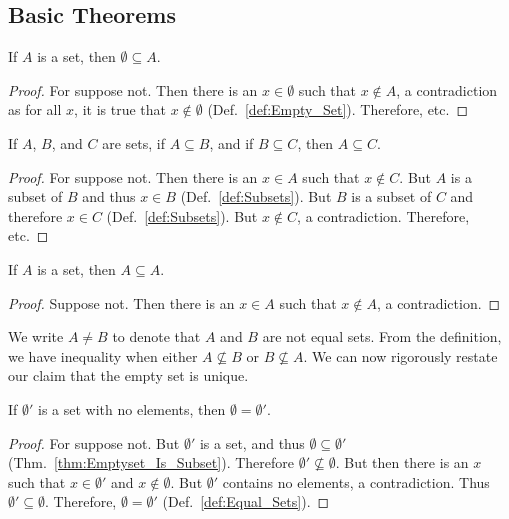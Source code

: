     \subsection{Basic Theorems}
        \begin{theorem}
            \label{thm:Emptyset_Is_Subset}%
            If $A$ is a set, then $\emptyset\subseteq{A}$.
        \end{theorem}
        \begin{proof}
            For suppose not. Then there is an $x\in\emptyset$
            such that $x\notin{A}$, a contradiction as
            for all $x$, it is true that $x\notin\emptyset$
            (Def.~\ref{def:Empty_Set}). Therefore, etc.
        \end{proof}
        \begin{theorem}
            \label{thm:Subset_is_Transitive}%
            If $A$, $B$, and $C$ are sets, if
            $A\subseteq{B}$, and if $B\subseteq{C}$, then
            $A\subseteq{C}$.
        \end{theorem}
        \begin{proof}
            For suppose not. Then there is an $x\in{A}$ such
            that $x\notin{C}$. But $A$ is a subset of $B$
            and thus $x\in{B}$ (Def.~\ref{def:Subsets}). But
            $B$ is a subset of $C$ and therefore $x\in{C}$
            (Def.~\ref{def:Subsets}). But $x\notin{C}$, a
            contradiction. Therefore, etc.
        \end{proof}
        \begin{theorem}
            \label{thm:Set_Is_Subset_Of_Self}%
            If $A$ is a set, then $A\subseteq{A}$.
        \end{theorem}
        \begin{proof}
            Suppose not. Then there is an $x\in{A}$
            such that $x\notin{A}$, a contradiction.
        \end{proof}
        We write $A\ne{B}$ to denote that $A$ and $B$ are
        not equal sets. From the definition, we have
        inequality when either $A\nsubseteq{B}$ or
        $B\nsubseteq{A}$.
        We can now rigorously restate our claim that the
        empty set is unique.
        \begin{theorem}
            If $\emptyset'$ is a set with no elements,
            then $\emptyset=\emptyset'$.
        \end{theorem}
        \begin{proof}
            For suppose not. But $\emptyset'$ is a set, and
            thus $\emptyset\subseteq\emptyset'$
            (Thm.~\ref{thm:Emptyset_Is_Subset}). Therefore
            $\emptyset'\nsubseteq\emptyset$. But then there
            is an $x$ such that $x\in\emptyset'$ and
            $x\notin\emptyset$. But $\emptyset'$ contains
            no elements, a contradiction. Thus
            $\emptyset'\subseteq\emptyset$. Therefore,
            $\emptyset=\emptyset'$
            (Def.~\ref{def:Equal_Sets}).
        \end{proof}
